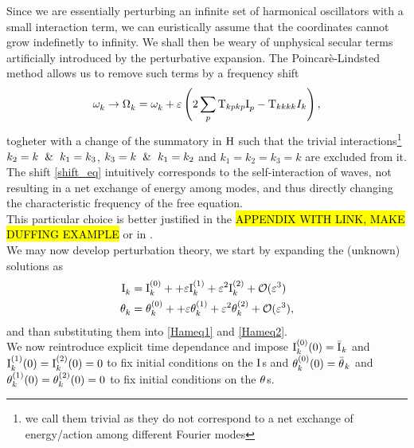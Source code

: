 Since we are essentially perturbing an infinite set of harmonical oscillators with a small interaction term, we can euristically assume that
the coordinates cannot grow indefinetly to infinity. We shall then be weary of unphysical secular terms artificially introduced by the perturbative
expansion. The Poincarè-Lindsted method allows us to remove such terms by a frequency shift
\begin{equation}
    \omega^{}_k \rightarrow \Omega^{}_k = \omega^{}_k + \varepsilon \left(2\sum_p \mathrm{T}_{kpkp}\mathrm{I}^{}_p - \mathrm{T}_{kkkk}I_k \right),
    \label{shift_eq}
\end{equation}   
togheter with a change of the summatory in $\mathrm{H}$ such that the trivial interactions\footnote{
    we call them trivial as they do not correspond to a net exchange of energy/action among different Fourier modes
} $k_2=k \hspace{2mm}\&\hspace{2mm} k_1 = k_3$, $k_3=k \hspace{2mm}\& \hspace{2mm}k_1=k_2$ and $k_1=k_2=k_3=k$ are excluded from it. \\
The shift \eqref{shift_eq} intuitively corresponds to the self-interaction of waves, not resulting in a net exchange of energy among modes, and thus directly changing 
the characteristic frequency of the free equation. \\ 
This particular choice is better justified in the \hl{APPENDIX WITH LINK, MAKE DUFFING EXAMPLE} or in \cite{Nazarenko2011}. \\

We may now develop perturbation theory, we start by expanding the (unknown) solutions as
\begin{align}
    \mathrm{I}^{}_k &= \mathrm{I}^{(0)}_k +  + \varepsilon \mathrm{I}^{(1)}_k + \varepsilon^2 \mathrm{I}^{(2)}_k + \mathcal{O}(\varepsilon^3) \\
    \theta^{}_k &= \theta^{(0)}_k +  + \varepsilon \theta^{(1)}_k + \varepsilon^2 \theta^{(2)}_k + \mathcal{O}(\varepsilon^3),
\end{align}
and than substituting them into \eqref{Hameq1} and \eqref{Hameq2}. \\
We now reintroduce explicit time dependance and impose $\mathrm{I}^{(0)}_k(0) = \bar{\mathrm{I}^{}}_k$ and $\mathrm{I}^{(1)}_k(0) = \mathrm{I}^{(2)}_k(0) = 0$ to fix initial conditions on the $\mathrm{I}^{}$s and 
$\theta^{(0)}_k(0) = \bar{\theta^{}}_k$ and $\theta^{(1)}_k(0) = \theta^{(2)}_k(0) = 0$ to fix initial conditions on the $\theta^{}$s.\\

